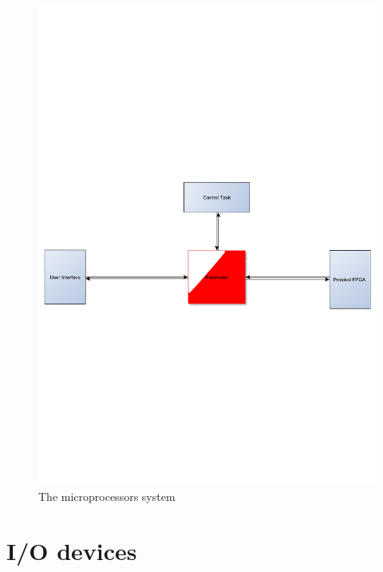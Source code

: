 \begin{figure}[htb]
	\centering
	\includegraphics[scale=0.3,clip,trim=0 300 0 300]{graphics/microprocessor} %
	\caption{The microprocessors system}
	\label{fig:microprocessor}			%
\end{figure}

\section{I/O devices}\label{sec:iodevices}

